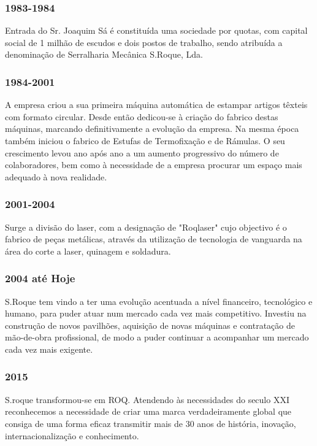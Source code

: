 \begin{frame}
\frametitle{1983-1984}
Entrada do Sr. Joaquim Sá é constituída uma sociedade por quotas, com capital social de 1 milhão de escudos e dois postos de trabalho, sendo atribuída a denominação de Serralharia Mecânica S.Roque, Lda.
\end{frame}
\begin{frame}
\frametitle{1984-2001}
A empresa criou a sua primeira máquina automática de estampar artigos têxteis com formato circular. Desde então dedicou-se à criação do fabrico destas máquinas, marcando definitivamente a evolução da empresa. Na mesma época também iniciou o fabrico de Estufas de Termofixação e de Rámulas. O seu crescimento levou ano após ano a um aumento progressivo do número de colaboradores, bem como à necessidade de a empresa procurar um espaço mais adequado à nova realidade.
\end{frame}
\begin{frame}
\frametitle{2001-2004}
Surge a divisão do laser, com a designação de "Roqlaser" cujo objectivo é o fabrico de peças metálicas, através da utilização de tecnologia de vanguarda na área do corte a laser, quinagem e soldadura.
\end{frame}
\begin{frame}
\frametitle{2004 até Hoje}
S.Roque tem vindo a ter uma evolução acentuada a nível financeiro, tecnológico e humano, para puder atuar num mercado cada vez mais competitivo. Investiu na construção de novos pavilhões, aquisição de novas máquinas e contratação de mão-de-obra profissional, de modo a puder continuar a acompanhar um mercado cada vez mais exigente.
\end{frame}
\begin{frame}
\frametitle{2015}
S.roque transformou-se em ROQ. Atendendo às necessidades do seculo XXI reconhecemos a necessidade de criar uma marca verdadeiramente global que consiga de uma forma eficaz transmitir mais de 30 anos de história, inovação, internacionalização e conhecimento.
\end{frame}
